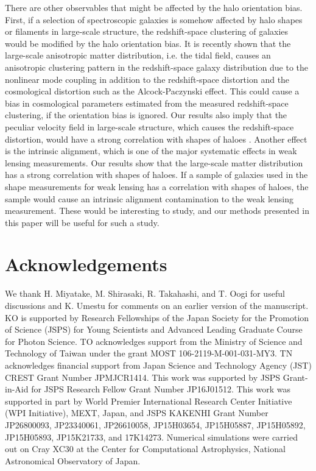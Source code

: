 \documentclass[a4paper,fleqn,usenatbib]{mnras}
\begin{document}
There are other observables that might be affected by the halo orientation bias.
First, if a selection of spectroscopic galaxies is somehow affected
by halo shapes or filaments in large-scale structure,
the redshift-space clustering of galaxies
would be modified by the halo orientation bias. It is recently shown that
the large-scale anisotropic matter distribution, i.e. the tidal field,
causes an anisotropic clustering pattern in the redshift-space
galaxy distribution due to the nonlinear mode coupling
\citep{AkitsuTakadaLi:17,AkitsuTakada:17}
in addition to the redshift-space distortion and
the cosmological distortion such as the Alcock-Paczynski effect.
This could cause a bias in cosmological parameters estimated from
the measured redshift-space clustering, if the orientation bias is ignored.
Our results also imply that the peculiar velocity field in large-scale structure,
which causes the redshift-space distortion, would have a strong correlation
with shapes of haloes \citep[e.g.][]{Okumuraetal:17}.
Another effect is the intrinsic alignment,
which is one of the major systematic effects in weak lensing measurements.
Our results show that the large-scale matter distribution
has a strong correlation with shapes of haloes.
If a sample of galaxies used in the shape measurements
for weak lensing has a correlation with shapes of haloes,
the sample would cause an intrinsic alignment contamination
to the weak lensing measurement. These would be interesting to study,
and our methods presented in this paper will be useful for such a study.

\section*{Acknowledgements}
We thank H. Miyatake, M. Shirasaki, R. Takahashi, and T. Oogi
for useful discussions and K. Umestu for comments
on an earlier version of the manuscript.
KO is supported by Research Fellowships of the Japan Society for the
Promotion of Science (JSPS) for Young Scientists and Advanced Leading
Graduate Course for Photon Science.
TO acknowledges support from the Ministry of Science and Technology of Taiwan
under the grant MOST 106-2119-M-001-031-MY3.
TN acknowledges financial support
from Japan Science and Technology Agency (JST) CREST Grant Number JPMJCR1414.
This work was supported by JSPS Grant-in-Aid for JSPS Research Fellow
Grant Number JP16J01512.
This work was supported in part by World Premier International
Research Center Initiative (WPI Initiative), MEXT, Japan, and JSPS
KAKENHI Grant Number JP26800093, JP23340061, JP26610058, JP15H03654,
JP15H05887, JP15H05892, JP15H05893, JP15K21733, and 17K14273.
Numerical simulations were carried out on Cray XC30
at the Center for Computational Astrophysics,
National Astronomical Observatory of Japan.
\end{document}
